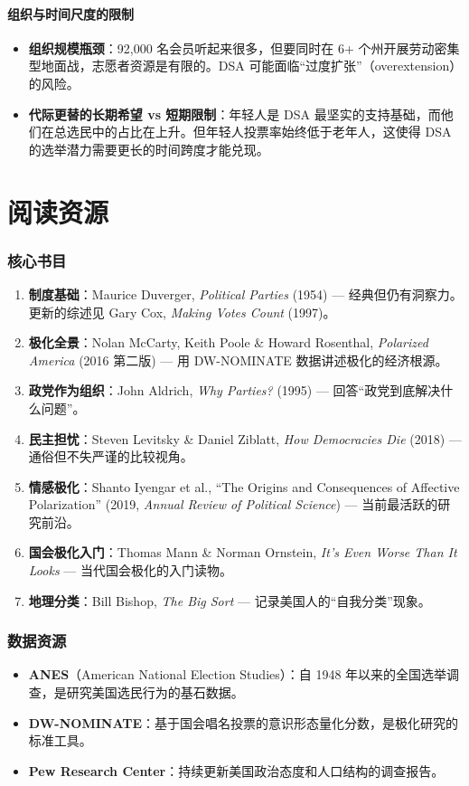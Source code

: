 \documentclass[12pt,a4paper]{ctexart}
\begin{document}
\subsection{组织与时间尺度的限制}

\begin{itemize}
  \item \textbf{组织规模瓶颈}：92{,}000 名会员听起来很多，但要同时在 6+ 个州开展劳动密集型地面战，志愿者资源是有限的。DSA 可能面临``过度扩张''（overextension）的风险。
  \item \textbf{代际更替的长期希望 vs 短期限制}：年轻人是 DSA 最坚实的支持基础，而他们在总选民中的占比在上升。但年轻人投票率始终低于老年人，这使得 DSA 的选举潜力需要更长的时间跨度才能兑现。
\end{itemize}

\clearpage

\part{阅读资源}

\section{核心书目}

\begin{enumerate}
  \item \textbf{制度基础}：Maurice Duverger, \emph{Political Parties} (1954) — 经典但仍有洞察力。更新的综述见 Gary Cox, \emph{Making Votes Count} (1997)。
  \item \textbf{极化全景}：Nolan McCarty, Keith Poole \& Howard Rosenthal, \emph{Polarized America} (2016 第二版) — 用 DW-NOMINATE 数据讲述极化的经济根源。
  \item \textbf{政党作为组织}：John Aldrich, \emph{Why Parties?} (1995) — 回答``政党到底解决什么问题''。
  \item \textbf{民主担忧}：Steven Levitsky \& Daniel Ziblatt, \emph{How Democracies Die} (2018) — 通俗但不失严谨的比较视角。
  \item \textbf{情感极化}：Shanto Iyengar et al., ``The Origins and Consequences of Affective Polarization'' (2019, \emph{Annual Review of Political Science}) — 当前最活跃的研究前沿。
  \item \textbf{国会极化入门}：Thomas Mann \& Norman Ornstein, \emph{It's Even Worse Than It Looks} — 当代国会极化的入门读物。
  \item \textbf{地理分类}：Bill Bishop, \emph{The Big Sort} — 记录美国人的``自我分类''现象。
\end{enumerate}

\section{数据资源}

\begin{itemize}
  \item \textbf{ANES}（American National Election Studies）：自 1948 年以来的全国选举调查，是研究美国选民行为的基石数据。
  \item \textbf{DW-NOMINATE}：基于国会唱名投票的意识形态量化分数，是极化研究的标准工具。
  \item \textbf{Pew Research Center}：持续更新美国政治态度和人口结构的调查报告。
\end{itemize}
\end{document}
